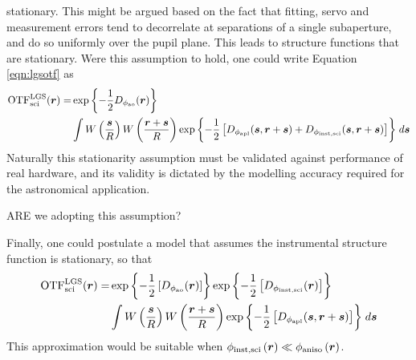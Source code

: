 stationary.  This might be argued based on the fact that fitting,
servo and measurement errors tend to decorrelate at separations of a
single subaperture, and do so uniformly over the pupil plane.  This
leads to structure functions that are stationary.  Were this
assumption to hold, one could write Equation \ref{eqn:lgsotf} as
\begin{equation}\label{eqn:lgsotfb}
\begin{aligned}
{\rm OTF}^{\rm LGS}_{\rm sci}(\boldsymbol{r}) = 
& \exp{
\left\{ -\frac{1}{2} D_{\rm \phi_{\rm ao}}(\boldsymbol{r}) \right\}}  \\
& \int 
W \left( \frac{\boldsymbol{s}}{R} \right)
W \left( \frac{\boldsymbol{r} + \boldsymbol{s}}{R} \right)
\exp{ \left\{ -\frac{1}{2} \left[
D_{\rm \phi_{apl}}(\boldsymbol{s}, \boldsymbol{r} + \boldsymbol{s}) +
D_{\rm \phi_{inst,sci}}(\boldsymbol{s}, \boldsymbol{r} + \boldsymbol{s})
\right] \right\} }
\; d\boldsymbol{s} 
\end{aligned}
\end{equation}
Naturally this stationarity assumption must be validated against
performance of real hardware, and its validity is dictated by the
modelling accuracy required for the astronomical application.  
\begin{notes}
ARE we adopting this assumption? 
\end{notes}

Finally, one could postulate a model that assumes the instrumental
structure function is stationary, so that
\begin{equation}\label{eqn:lgsotfc}
\begin{aligned}
{\rm OTF}^{\rm LGS}_{\rm sci}(\boldsymbol{r}) = 
& \exp{ \left\{ -\frac{1}{2}
\left[ D_{\rm \phi_{\rm ao}}(\boldsymbol{r}) \right] \right\} } 
\exp{ \left\{ -\frac{1}{2}
\left[ D_{\rm \phi_{\rm inst,sci}}(\boldsymbol{r}) \right] \right\} }  \\
& \int 
W \left( \frac{\boldsymbol{s}}{R} \right)
W \left( \frac{\boldsymbol{r} + \boldsymbol{s}}{R} \right)
\exp{ \left\{ -\frac{1}{2} \left[
D_{\rm \phi_{apl}}(\boldsymbol{s},\boldsymbol{r} + \boldsymbol{s})
\right] \right\} }
\; d\boldsymbol{s} 
\end{aligned}
\end{equation}
This approximation would be suitable when 
$\phi_{\rm inst,sci} \left( \boldsymbol{r} \right) \ll 
\phi_{\rm aniso} \left( \boldsymbol{r} \right)$.


